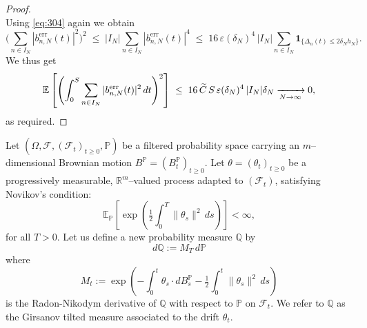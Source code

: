 \documentclass[12pt,reqno]{amsart}
\theoremstyle{plain}
\theoremstyle{definition}
\theoremstyle{remark}
\begin{document}
\begin{proof}
\begin{equation}
\end{equation}
Using \eqref{eq:304} again we obtain
\begin{equation}
\Big(\sum_{n\in I_N} |b^{\mathrm{err}}_{n,N}(t)|^2\Big)^{\!2}
\;\le\; |I_N|\sum_{n\in I_N} |b^{\mathrm{err}}_{n,N}(t)|^4
\;\le\; 16\,\varepsilon(\delta_N)^4\,|I_N|
\sum_{n\in I_N}\mathbf{1}_{\{\Delta_n(t)\le 2\delta_N h_N\}} .
\end{equation}
We thus get 
\begin{equation}
\mathbb{E} \left [ \left(\int_0^S \sum_{n\in I_N} |b^{\mathrm{err}}_{n,N}(t)|^2 \,dt\right)^2 \right]
\;\le\; 16 \, \widetilde{C} \, S\,\varepsilon(\delta_N)^4\,|I_N| \delta_N \xrightarrow[N\to\infty]{\ \\ \ } 0,
\end{equation}
as required. 
\end{proof}

Let $(\Omega,\mathcal F,(\mathcal F_t)_{t\ge0},\mathbb P)$ be a filtered probability space
carrying an $m$–dimensional Brownian motion $B^{\mathbb{P}}=(B^{\mathbb{P}}_t)_{t\ge0}$. 
Let $\theta=(\theta_t)_{t\ge0}$ be a progressively measurable, $\mathbb R^m$–valued process 
adapted to $(\mathcal F_t)$,
satisfying Novikov’s condition:
\begin{equation}
\mathbb E_{\mathbb P}\!\left[\exp\!\left(\tfrac12\int_0^T \|\theta_s\|^2\,ds\right)\right]<\infty,
\end{equation}
for all $T>0$. Let us define a new probability measure $\mathbb Q$ by 
\begin{equation}
d\mathbb Q:=M_T\,d\mathbb P
\end{equation} 
where 
\begin{equation}
M_t:=\exp\!\left(-\int_0^t \theta_s\!\cdot dB^{\mathbb{P}}_s-\tfrac12\int_0^t\|\theta_s\|^2\,ds\right)
\end{equation}
is the Radon-Nikodym derivative of $\mathbb{Q}$ with respect to $\mathbb{P}$ on $\mathcal{F}_t$. We refer to $\mathbb{Q}$ as the Girsanov tilted measure associated to the drift $\theta_t$.   
\end{document}
